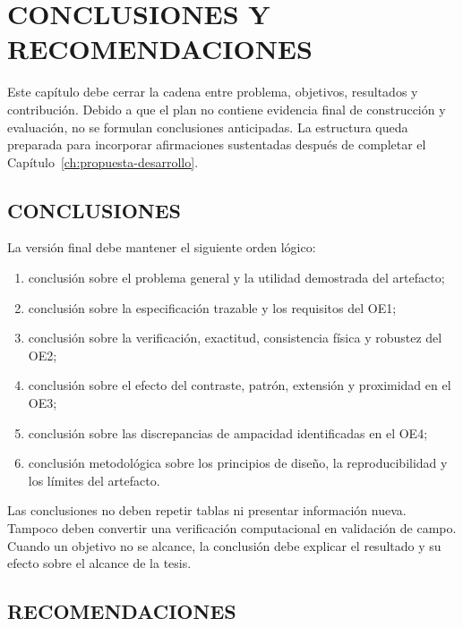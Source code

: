 \chapter{CONCLUSIONES Y RECOMENDACIONES}
\label{ch:conclusiones}

Este capítulo debe cerrar la cadena entre problema, objetivos, resultados y contribución. Debido a que el plan no contiene evidencia final de construcción y evaluación, no se formulan conclusiones anticipadas. La estructura queda preparada para incorporar afirmaciones sustentadas después de completar el Capítulo~\ref{ch:propuesta-desarrollo}.

\section{CONCLUSIONES}


La versión final debe mantener el siguiente orden lógico:

\begin{enumerate}
  \item conclusión sobre el problema general y la utilidad demostrada del artefacto;
  \item conclusión sobre la especificación trazable y los requisitos del OE1;
  \item conclusión sobre la verificación, exactitud, consistencia física y robustez del OE2;
  \item conclusión sobre el efecto del contraste, patrón, extensión y proximidad en el OE3;
  \item conclusión sobre las discrepancias de ampacidad identificadas en el OE4;
  \item conclusión metodológica sobre los principios de diseño, la reproducibilidad y los límites del artefacto.
\end{enumerate}

Las conclusiones no deben repetir tablas ni presentar información nueva. Tampoco deben convertir una verificación computacional en validación de campo. Cuando un objetivo no se alcance, la conclusión debe explicar el resultado y su efecto sobre el alcance de la tesis.

\section{RECOMENDACIONES}

